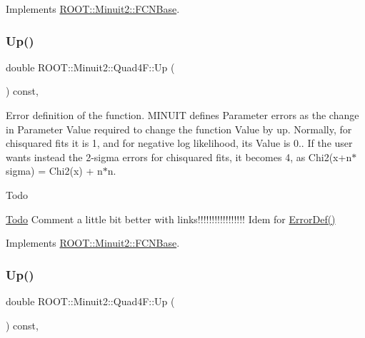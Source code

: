 Implements \mbox{\hyperlink{classROOT_1_1Minuit2_1_1FCNBase_ae4a86bd94d0d0f5ca6fc8f8ab2bb43cd}{R\+O\+O\+T\+::\+Minuit2\+::\+F\+C\+N\+Base}}.

\mbox{\label{classROOT_1_1Minuit2_1_1Quad4F_a19ebb5413722895a7635626cca02ebe9}} 
\subsubsection{\texorpdfstring{Up()}{Up()}\hspace{0.1cm}{\footnotesize\ttfamily [1/2]}}
{\footnotesize\ttfamily double R\+O\+O\+T\+::\+Minuit2\+::\+Quad4\+F\+::\+Up (\begin{DoxyParamCaption}{ }\end{DoxyParamCaption}) const\hspace{0.3cm}{\ttfamily [inline]}, {\ttfamily [virtual]}}

Error definition of the function. M\+I\+N\+U\+IT defines Parameter errors as the change in Parameter Value required to change the function Value by up. Normally, for chisquared fits it is 1, and for negative log likelihood, its Value is 0.. If the user wants instead the 2-\/sigma errors for chisquared fits, it becomes 4, as Chi2(x+n$\ast$sigma) = Chi2(x) + n$\ast$n.

\begin{DoxyRefDesc}{Todo}
\item[\mbox{\hyperlink{todo__todo000001}{Todo}}]Comment a little bit better with links!!!!!!!!!!!!!!!!! Idem for \mbox{\hyperlink{classROOT_1_1Minuit2_1_1FCNBase_ac4592475c58a65b037ba97ab5f3cba10}{Error\+Def()}}\end{DoxyRefDesc}


Implements \mbox{\hyperlink{classROOT_1_1Minuit2_1_1FCNBase_a04ef08ddad92ce8d89d498efbe021c39}{R\+O\+O\+T\+::\+Minuit2\+::\+F\+C\+N\+Base}}.

\mbox{\label{classROOT_1_1Minuit2_1_1Quad4F_a19ebb5413722895a7635626cca02ebe9}} 
\subsubsection{\texorpdfstring{Up()}{Up()}\hspace{0.1cm}{\footnotesize\ttfamily [2/2]}}
{\footnotesize\ttfamily double R\+O\+O\+T\+::\+Minuit2\+::\+Quad4\+F\+::\+Up (\begin{DoxyParamCaption}{ }\end{DoxyParamCaption}) const\hspace{0.3cm}{\ttfamily [inline]}, {\ttfamily [virtual]}}


